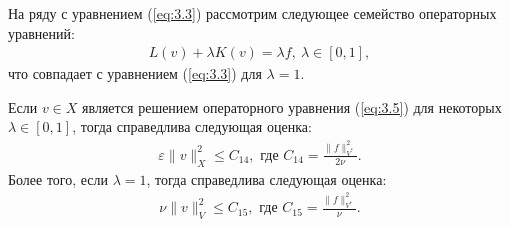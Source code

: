 На ряду с уравнением (\ref{eq:3.3}) рассмотрим следующее семейство операторных уравнений:
\begin{equation}\label{eq:3.5}
    \begin{gathered}
    L(v)+\lambda K(v)=\lambda f, \ \lambda\in [0,1],
    \end{gathered}
\end{equation}
что совпадает с уравнением (\ref{eq:3.3}) для $\lambda=1$.

\begin{theorem}\label{tm:3.1}
    Если $v\in X$ является решением операторного уравнения (\ref{eq:3.5}) для некоторых $\lambda\in [0,1]$, тогда справедлива следующая оценка:
    \begin{equation}\label{eq:3.6}
        \begin{gathered}
            \varepsilon\|v\|^2_X\leqslant C_{14}, \textrm{ где } C_{14}=\frac{\|f\|^2_{V^*}}{2\nu}.
        \end{gathered}
    \end{equation}
    Более того, если $\lambda = 1$, тогда справедлива следующая оценка:
    \begin{equation}\label{eq:3.7}
        \begin{gathered}
            \nu\|v\|^2_V\leqslant C_{15}, \textrm{ где } C_{15}=\frac{\|f\|^2_{V^*}}{\nu}.
        \end{gathered}
    \end{equation}
\end{theorem}

